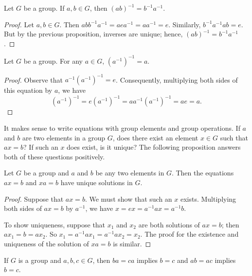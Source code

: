  
\begin{proposition}
Let $G$ be a group. If $a, b \in G$, then $(ab)^{-1} = b^{-1}a^{-1}$. 
\end{proposition}
 
 
\begin{proof}
Let $a, b \in G$. Then $abb^{-1}a^{-1} = aea^{-1} = aa^{-1} = e$.
Similarly, $b^{-1}a^{-1}ab = e$. But by the previous proposition,
inverses are unique; hence, $(ab)^{-1} = b^{- 1}a^{-1}$.
\end{proof}
 
 
\begin{proposition}
Let $G$ be a group.  For any $a \in G$, $(a^{-1})^{-1} = a$.
\end{proposition}
 
 
\begin{proof}
Observe that $a^{-1} (a^{-1})^{-1} = e$. Consequently, multiplying
both sides of this equation by $a$, we have 
\[
(a^{-1})^{-1} = e (a^{-1})^{-1} = a a^{-1} (a^{-1})^{-1} = ae = a.
\]
\end{proof}
 
 
\medskip
 
 
It makes sense to write equations with group elements and group
operations. If $a$ and $b$ are two elements in a group $G$, does there 
exist an element $x \in G$ such that $ax = b$? If such an $x$ does
exist, is it unique? The following proposition answers both of these
questions positively. 
 
 
\begin{proposition}\label{group_equations}
Let $G$ be a group and $a$ and $b$ be any two elements in $G$. Then
the equations $ax = b$ and $xa = b$ have unique solutions in $G$. 
\end{proposition}
 
 
\begin{proof}
Suppose that $ax = b$. We must show that such an $x$ exists.
Multiplying both sides of $ax = b$ by $a^{-1}$, we have $x = ex =
a^{-1}ax = a^{-1}b$. 
 
 
To show uniqueness, suppose that $x_1$ and $x_2$ are both solutions of
$ax = b$; then $ax_1 = b = ax_2$. So $x_1 = a^{-1}ax_1 = a^{-1}ax_2 =
x_2$. The proof for the existence and uniqueness of the solution of
$xa = b$ is similar. 
\end{proof}
 

 
\begin{proposition}
If $G$ is a group and $a, b, c \in G$, then $ba = ca$ implies $b = c$
and $ab = ac$ implies $b = c$. 
\end{proposition} 
 
